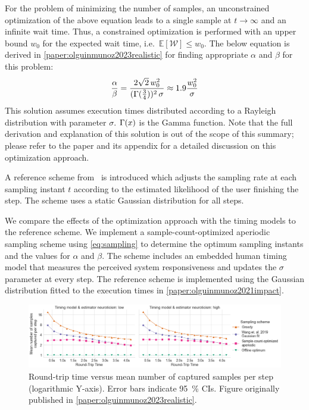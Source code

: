 \medskip
For the problem of minimizing the number of samples, an unconstrained optimization of the above equation leads to a single sample at \ensuremath{t \rightarrow \infty} and an infinite wait time.
Thus, a constrained optimization is performed with an upper bound \ensuremath{w_0} for the expected wait time, i.e.\ \ensuremath{\mathbb{E}[\mathcal{W}] \leq w_0}.
The below equation is derived in \cref{paper:olguinmunoz2023realistic} for finding appropriate \ensuremath{\alpha} and \ensuremath{\beta} for this problem:
\begin{alignat}{1}\label{eq:sampling}
\frac{\alpha}{\beta}=\frac{2\sqrt{2}\,w_0^2}{(\mathlarger{\Gamma}(\tfrac{3}{4}))^2\,\sigma}\approx1.9\frac{w_0^2}{\sigma}
\end{alignat}
This solution assumes execution times distributed according to a Rayleigh distribution with parameter \ensuremath{\sigma}.
\ensuremath{\mathlarger{\Gamma}(x)} is the Gamma function.
Note that the full derivation and explanation of this solution is out of the scope of this summary;
please refer to the paper and its appendix for a detailed discussion on this optimization approach.

A reference scheme from~\cite{wang2019towards} is introduced which adjusts the sampling rate at each sampling instant \ensuremath{t} according to the estimated likelihood of the user finishing the step.
The scheme uses a static Gaussian distribution for all steps.

We compare the effects of the optimization approach with the timing models to the reference scheme.
We implement a sample-count-optimized aperiodic sampling scheme using \cref{eq:sampling} to determine the optimum sampling instants and the values for \ensuremath{\alpha} and \ensuremath{\beta}.
The scheme includes an embedded human timing model that measures the perceived system responsiveness and updates the \ensuremath{\sigma} parameter at every step.
The reference scheme is implemented using the Gaussian distribution fitted to the execution times in \cref{paper:olguinmunoz2021impact}.

\begin{figure}
    \centering
    \includegraphics[width=\textwidth]{publications/2023EdgeDroid2/figs/new_model/sampling_optimization}
    \caption{%
        Round-trip time versus mean number of captured samples per step (logarithmic Y-axis).
        Error bars indicate \SI{95}{\percent} \glspl{CI}.
        Figure originally published in \cref{paper:olguinmunoz2023realistic}.
    }\label{fig:samplingresults}
\end{figure}


